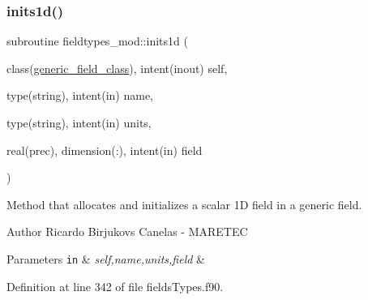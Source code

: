 \subsubsection{\texorpdfstring{inits1d()}{inits1d()}}
{\footnotesize\ttfamily subroutine fieldtypes\+\_\+mod\+::inits1d (\begin{DoxyParamCaption}\item[{class(\mbox{\hyperlink{structfieldtypes__mod_1_1generic__field__class}{generic\+\_\+field\+\_\+class}}), intent(inout)}]{self,  }\item[{type(string), intent(in)}]{name,  }\item[{type(string), intent(in)}]{units,  }\item[{real(prec), dimension(\+:), intent(in)}]{field }\end{DoxyParamCaption})\hspace{0.3cm}{\ttfamily [private]}}



Method that allocates and initializes a scalar 1D field in a generic field. 

\begin{DoxyAuthor}{Author}
Ricardo Birjukovs Canelas -\/ M\+A\+R\+E\+T\+EC 
\end{DoxyAuthor}

\begin{DoxyParams}[1]{Parameters}
\mbox{\tt in}  & {\em self,name,units,field} & \\
\hline
\end{DoxyParams}


Definition at line 342 of file fields\+Types.\+f90.


